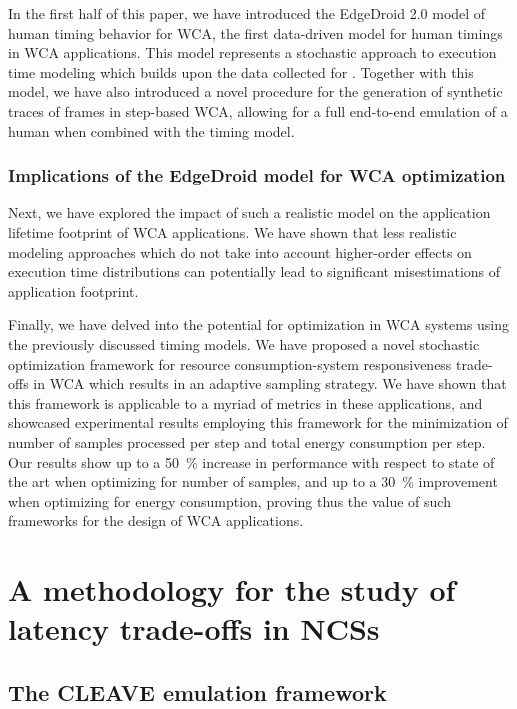 In the first half of this paper, we have introduced the EdgeDroid 2.0 model of human timing behavior for \ac{WCA}, the first data-driven model for human timings in \ac{WCA} applications.
This model represents a stochastic approach to execution time modeling which builds upon the data collected for \textcite{olguinmunoz:impact2021}.
Together with this model, we have also introduced a novel procedure for the generation of synthetic traces of frames in step-based \ac{WCA}, allowing for a full end-to-end emulation of a human when combined with the timing model.

\subsubsection{Implications of the EdgeDroid model for \ac{WCA} optimization}

Next, we have explored the impact of such a realistic model on the application lifetime footprint of \ac{WCA} applications.
We have shown that less realistic modeling approaches which do not take into account higher-order effects on execution time distributions can potentially lead to significant misestimations of application footprint.

Finally, we have delved into the potential for optimization in \ac{WCA} systems using the previously discussed timing models.
We have proposed a novel stochastic optimization framework for resource consumption-system responsiveness trade-offs in \ac{WCA} which results in an adaptive sampling strategy. 
We have shown that this framework is applicable to a myriad of metrics in these applications, and showcased experimental results employing this framework for the minimization of number of samples processed per step and total energy consumption per step.
Our results show up to a \SI{50}{\percent} increase in performance with respect to state of the art when optimizing for number of samples, and up to a \SI{30}{\percent} improvement when optimizing for energy consumption, proving thus the value of such frameworks for the design of \ac{WCA} applications.

\section{A methodology for the study of latency trade-offs in \acsp{NCS}}

\subsection{The CLEAVE emulation framework}

